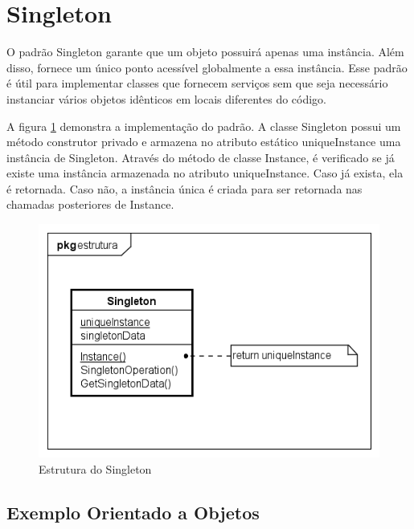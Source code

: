 \section{Singleton}

O padrão Singleton garante que um objeto possuirá apenas uma 
instância. Além disso, fornece um único ponto acessível 
globalmente a essa instância. Esse padrão é útil 
para implementar classes que fornecem serviços sem que seja 
necessário instanciar vários objetos idênticos em 
locais diferentes do código.\cite{gamma:1995}

A figura \ref{singleton_struct} demonstra a implementação 
do padrão. A classe Singleton possui um método construtor 
privado e armazena no atributo estático uniqueInstance uma 
instância de Singleton. Através do método de classe 
Instance, é verificado se já existe uma instância 
armazenada no atributo uniqueInstance. Caso já exista, 
ela é retornada. Caso não, a instância única é criada 
para ser retornada nas chamadas posteriores de Instance.

\begin{figure}[htb]
	\caption{\label{singleton_struct}Estrutura do Singleton}
	\begin{center}
	    \includegraphics[scale=0.6]{5_padroes-contexto-funcional/5.1_criacionais/5.1.5_singleton/singleton_estrutura.png}
	\end{center}
\end{figure}

\subsection*{Exemplo Orientado a Objetos}

